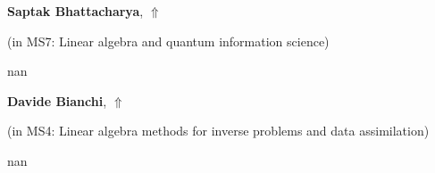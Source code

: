 \documentclass[ILAS2025-program.tex]{subfiles}
\begin{document}
     \hypertarget{down0207}{}\begin{ilasabstract}
    
    \textbf{Saptak Bhattacharya},  \hfill \hyperlink{up0207}{$\Uparrow$}
    
    (in {\color{mstitle}MS7: Linear algebra and quantum information science})
        
        \mtskip
    nan\end{ilasabstract}
     \hypertarget{down0201}{}\begin{ilasabstract}
    
    \textbf{Davide Bianchi},  \hfill \hyperlink{up0201}{$\Uparrow$}
    
    (in {\color{mstitle}MS4: Linear algebra methods for inverse problems and data assimilation})
        
        \mtskip
    nan\end{ilasabstract}
\end{document}
